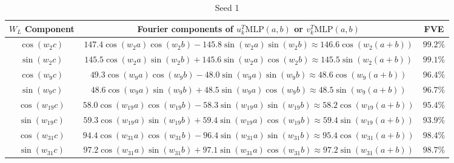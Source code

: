 \documentclass{article} %
\newcommand{\cosp}[1]{\cos \left ( #1 \right )}
\newcommand{\sinp}[1]{\sin \left ( #1 \right )}
\newcommand{\MLP}{\textrm{MLP}}
\begin{document}
\begin{table}[]
    \centering
    \small
    \begin{subtable}{1\textwidth}
    \centering
        \begin{tabular}{c|c|c}
         $W_{L}$ Component & Fourier components of $u_k^T \MLP(a,b)$ or $v_k^T \MLP(a,b)$& FVE\\
         \hline 
        $\cosp{w_{2}c}$ & $147.4 \cosp{w_{2}a}\cosp{w_{2}b} -145.8 \sinp{w_{2}a}\sinp{w_{2}b}\approx 146.6  \cosp{w_{2}(a+b)} $& $99.2 \%$ \\
$\sinp{w_{2}c}$ & $145.5 \cosp{w_{2}a}\sinp{w_{2}b} + 145.6 \sinp{w_{2}a}\cosp{w_{2}b}\approx 145.5  \sinp{w_{2}(a+b)} $& $99.1 \%$ \\
$\cosp{w_{9}c}$ & $49.3 \cosp{w_{9}a}\cosp{w_{9}b} -48.0 \sinp{w_{9}a}\sinp{w_{9}b}\approx 48.6  \cosp{w_{9}(a+b)} $& $96.4 \%$ \\
$\sinp{w_{9}c}$ & $48.6 \cosp{w_{9}a}\sinp{w_{9}b} + 48.5 \sinp{w_{9}a}\cosp{w_{9}b}\approx 48.5  \sinp{w_{9}(a+b)} $& $96.7 \%$ \\
$\cosp{w_{19}c}$ & $58.0 \cosp{w_{19}a}\cosp{w_{19}b} -58.3 \sinp{w_{19}a}\sinp{w_{19}b}\approx 58.2  \cosp{w_{19}(a+b)} $& $95.4 \%$ \\
$\sinp{w_{19}c}$ & $59.3 \cosp{w_{19}a}\sinp{w_{19}b} + 59.4 \sinp{w_{19}a}\cosp{w_{19}b}\approx 59.4  \sinp{w_{19}(a+b)} $& $93.9 \%$ \\
$\cosp{w_{31}c}$ & $94.4 \cosp{w_{31}a}\cosp{w_{31}b} -96.4 \sinp{w_{31}a}\sinp{w_{31}b}\approx 95.4  \cosp{w_{31}(a+b)} $& $98.4 \%$ \\
$\sinp{w_{31}c}$ & $97.2 \cosp{w_{31}a}\sinp{w_{31}b} + 97.1 \sinp{w_{31}a}\cosp{w_{31}b}\approx 97.2  \sinp{w_{31}(a+b)} $& $98.7 \%$ \\
    \end{tabular}
    \caption{Seed 1}
    \end{subtable}
    

\end{table}
\end{document}
